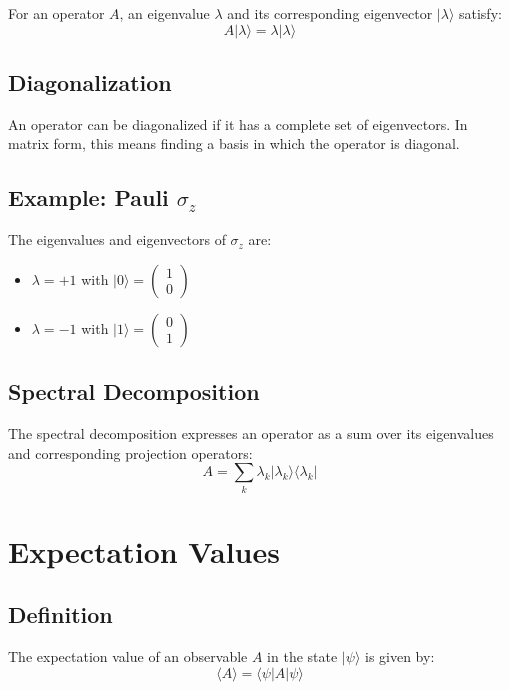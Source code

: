 \documentclass[12pt]{article}
\begin{document}
For an operator \( A \), an eigenvalue \( \lambda \) and its corresponding eigenvector \( |\lambda\rangle \) satisfy:
\[
A |\lambda\rangle = \lambda |\lambda\rangle
\]

\subsection{Diagonalization}

An operator can be diagonalized if it has a complete set of eigenvectors. In matrix form, this means finding a basis in which the operator is diagonal.

\subsection{Example: Pauli \( \sigma_z \)}

The eigenvalues and eigenvectors of \( \sigma_z \) are:
\begin{itemize}
    \item \( \lambda = +1 \) with \( |0\rangle = \begin{pmatrix} 1 \\ 0 \end{pmatrix} \)
    \item \( \lambda = -1 \) with \( |1\rangle = \begin{pmatrix} 0 \\ 1 \end{pmatrix} \)
\end{itemize}

\subsection{Spectral Decomposition}

The spectral decomposition expresses an operator as a sum over its eigenvalues and corresponding projection operators:
\[
A = \sum_{k} \lambda_k |\lambda_k\rangle \langle\lambda_k|
\]

\section{Expectation Values}

\subsection{Definition}

The expectation value of an observable \( A \) in the state \( |\psi\rangle \) is given by:
\[
\langle A \rangle = \langle \psi | A | \psi \rangle
\]
\end{document}

